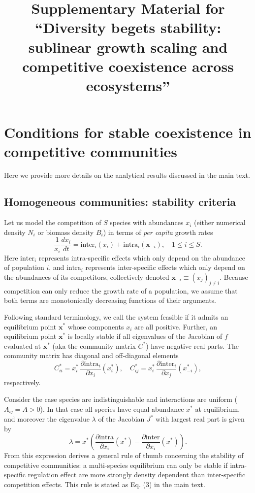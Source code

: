 \documentclass[12pt]{article}
\title{Supplementary Material for ``Diversity begets stability: sublinear growth scaling and competitive coexistence across ecosystems''}
\newcommand{\inter}{\textrm{inter}}
\newcommand{\intra}{\textrm{intra}}
\begin{document}
\appendix

\maketitle




\section{Conditions for stable coexistence in competitive communities}

Here we provide more details on the analytical results discussed in the main text. 

\subsection{Homogeneous communities: stability criteria}


Let us model the competition of $S$ species with abundances $x_i$ (either numerical density $N_i$ or biomass density $B_i$) in terms of \emph{per capita} growth rates  
\begin{equation}
\frac{1}{x_i}\frac{dx_i}{dt} = \inter_i(x_i) + \intra_i(\mathbf x_{-i}), \quad 1\leq i\leq S .
\end{equation}
Here $\inter_i$ represents intra-specific effects which only depend on the abundance of population $i$, and  $\intra_i$ represents inter-specific effects which only depend on the abundances of its competitors, collectively denoted $\mathbf x_{-i}\equiv (x_j)_{j \neq i}$. Because competition can only reduce the growth rate of a population, we assume that both terms are monotonically decreasing functions of their arguments. 

Following standard terminology, we call the system feasible if it admits an equilibrium point $\mathbf x^*$ whose components $x_i$ are all positive. Further, an equilibrium point $\mathbf x^*$ is locally stable if all eigenvalues of the Jacobian of $f$ evaluated at $\mathbf x^*$ (aka the community matrix $C^*$) have negative real parts. 
The community matrix has diagonal and off-diagonal elements 
\begin{equation}
    C^*_{ii} = x_i^*\, \frac{\partial \intra_i}{\partial x_i}(x_i^*), \quad C^*_{ij} = x_i^*\, \frac{\partial \inter_i}{\partial x_j}(x_{-i}^*),
\end{equation}
respectively. 

Consider the case species are indistinguishable and interactions are uniform ($A_{ij} = A>0$). In that case all species have equal abundance $x^*$ at equilibrium, and moreover the eigenvalue $\lambda$ of the Jacobian $J^*$ with largest real part is given by
\begin{equation}
    \lambda = x^* \left(\frac{\partial \intra}{\partial x_i}(x^*) - \frac{\partial \inter}{\partial x_i}(x^*)\right). 
\end{equation}
From this expression derives a general rule of thumb concerning the stability of competitive communities: a multi-species equilibrium can only be stable if intra-specific regulation effect are more strongly density dependent than inter-specific competition effects. This rule is stated as Eq. (3) in the main text. 
\end{document}
